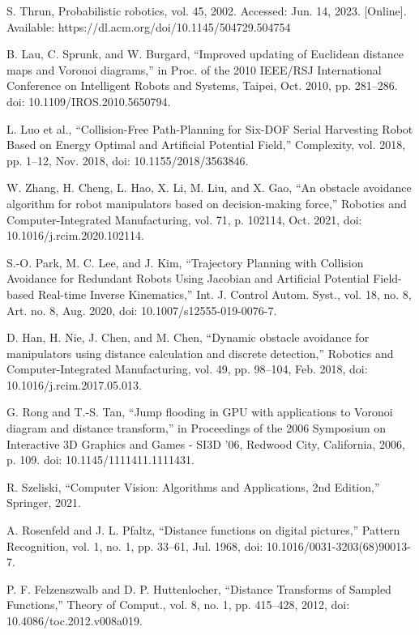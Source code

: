 \documentclass[letterpaper, 10 pt, conference]{ieeeconf}  %
\begin{document}
\begin{thebibliography}{99}
 S. Thrun, Probabilistic robotics, vol. 45, 2002. Accessed: Jun. 14, 2023. [Online]. Available: https://dl.acm.org/doi/10.1145/504729.504754

 B. Lau, C. Sprunk, and W. Burgard, “Improved updating of Euclidean distance maps and Voronoi diagrams,” in Proc. of the 2010 IEEE/RSJ International Conference on Intelligent Robots and Systems, Taipei, Oct. 2010, pp. 281–286. doi: 10.1109/IROS.2010.5650794.

 L. Luo et al., “Collision-Free Path-Planning for Six-DOF Serial Harvesting Robot Based on Energy Optimal and Artificial Potential Field,” Complexity, vol. 2018, pp. 1–12, Nov. 2018, doi: 10.1155/2018/3563846.

 W. Zhang, H. Cheng, L. Hao, X. Li, M. Liu, and X. Gao, “An obstacle avoidance algorithm for robot manipulators based on decision-making force,” Robotics and Computer-Integrated Manufacturing, vol. 71, p. 102114, Oct. 2021, doi: 10.1016/j.rcim.2020.102114.

 S.-O. Park, M. C. Lee, and J. Kim, “Trajectory Planning with Collision Avoidance for Redundant Robots Using Jacobian and Artificial Potential Field-based Real-time Inverse Kinematics,” Int. J. Control Autom. Syst., vol. 18, no. 8, Art. no. 8, Aug. 2020, doi: 10.1007/s12555-019-0076-7.

 D. Han, H. Nie, J. Chen, and M. Chen, “Dynamic obstacle avoidance for manipulators using distance calculation and discrete detection,” Robotics and Computer-Integrated Manufacturing, vol. 49, pp. 98–104, Feb. 2018, doi: 10.1016/j.rcim.2017.05.013.

 G. Rong and T.-S. Tan, “Jump flooding in GPU with applications to Voronoi diagram and distance transform,” in Proceedings of the 2006 Symposium on Interactive 3D Graphics and Games - SI3D ’06, Redwood City, California, 2006, p. 109. doi: 10.1145/1111411.1111431.

 R. Szeliski, “Computer Vision: Algorithms and Applications, 2nd Edition,” Springer, 2021.

 A. Rosenfeld and J. L. Pfaltz, “Distance functions on digital pictures,” Pattern Recognition, vol. 1, no. 1, pp. 33–61, Jul. 1968, doi: 10.1016/0031-3203(68)90013-7.

 P. F. Felzenszwalb and D. P. Huttenlocher, “Distance Transforms of Sampled Functions,” Theory of Comput., vol. 8, no. 1, pp. 415–428, 2012, doi: 10.4086/toc.2012.v008a019.


\end{thebibliography}
\end{document}
